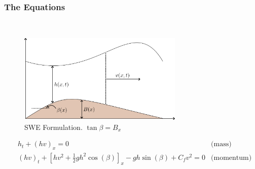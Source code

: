 \begin{frame}
    \frametitle{The Equations}

    \ \\
    \setlength{\belowcaptionskip}{-20pt}
    \begin{figure}
        \centering
        \includegraphics[width=0.7\textwidth]{images/swe_diagram.png}
        \caption{SWE Formulation. $\tan{\beta} = B_x$}
        \label{fig:03_swe_diagram}
    \end{figure}

    \begin{align*}
           & h_t + (h v)_x = 0 & \text{(mass)} \\
           & (h v)_t + \left[ hv^2 + \frac{1}{2} g h^2 \cos{(\beta)} \right]_x - g h \sin{(\beta)} + C_f v^2 = 0 & \text{(momentum)}
    \end{align*}
\end{frame}
